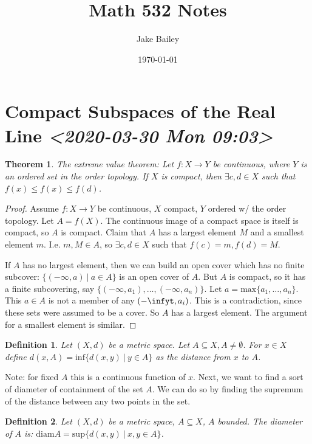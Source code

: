 \documentclass[11pt]{article}
\author{Jake Bailey}
\date{\today}
\title{Math 532 Notes}
\newtheorem{theorem}{Theorem}[section]
\newtheorem{definition}{Definition}[section]
\begin{document}
\maketitle
\tableofcontents

\section{Compact Subspaces of the Real Line \textit{<2020-03-30 Mon 09:03>}}
\label{sec:org79de15c}

\begin{theorem}
The extreme value theorem: Let \(f: X\rightarrow Y\) be continuous, where \(Y\) is
an ordered set in the order topology. If \(X\) is compact, then \(\exists c, d \in
X\) such that \(f(x) \leq f(x) \leq f(d)\). 
\end{theorem}

\begin{proof}
Assume \(f: X\rightarrow Y\) be continuous, \(X\) compact, \(Y\) ordered w/ the order
topology. Let \(A = f(X)\). The continuous image of a compact space is itself is
compact, so \(A\) is compact. Claim that \(A\) has a largest element \(M\) and a
smallest element \(m\). I.e. \(m, M \in A\), so \(\exists c, d \in X\) such that \(f(c)
= m, f(d) = M\).

If \(A\) has no largest element, then we can build an open cover which has no
finite subcover: \(\{(-\infty, a)\ |\ a\in A\}\) is an open cover of \(A\). But \(A\)
is compact, so it has a finite subcovering, say \(\{ (-\infty, a_1), \ldots,
(-\infty, a_n)\}\). Let \(a = \text{max}\{a_1, \ldots, a_n\}\). This \(a\in A\) is
not a member of any \((-\infyt, a_i)\). This is a contradiction, since these sets
were assumed to be a cover. So \(A\) has a largest element. The argument for a
smallest element is similar.  
\end{proof}

\begin{definition}
Let \((X, d)\) be a metric space. Let \(A\subseteq X, A\not = \emptyset\). For \(x\in
X\) define \(d(x,A) = \text{inf}\{d(x,y)\ |\ y\in A\}\) as the distance from \(x\) to
\(A\). 
\end{definition}

Note: for fixed \(A\) this is a continuous function of \(x\). Next, we want to find
a sort of diameter of containment of the set \(A\). We can do so by finding the
supremum of the distance between any two points in the set. 

\begin{definition}
Let \((X, d)\) be a metric space, \(A\subseteq X\), \(A\) bounded. The diameter of
\(A\) is: \(\text{diam} A = \text{sup}\{d(x,y)\ |\ x,y\in A\}\). 
\end{definition}
\end{document}
